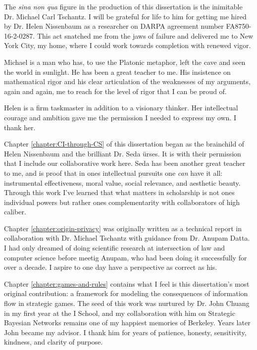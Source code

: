 \documentclass[../thesis.tex]{subfiles}
\begin{document}
 The \textit{sina non qua} figure in the production of this dissertation is the inimitable Dr. Michael Carl Tschantz.
 I will be grateful for life to him for getting me hired by Dr. Helen Nissenbaum as a researcher on DARPA agreement number FA8750-16-2-0287.
 This act snatched me from the jaws of failure and delivered me to New York City, my home, where I could work towards completion with renewed vigor.

 Michael is a man who has, to use the Platonic metaphor,
 left the cave and seen the world in sunlight.
 He has been a great teacher to me.
 His insistence on mathematical rigor and his clear
 articulation of the weaknesses of my arguments, again and again,
 me to reach for the level of rigor
 that I can be proud of.

 Helen is a firm taskmaster in addition to a visionary thinker.
 Her intellectual courage and ambition gave me the permission I needed to express my own.
 I thank her.
 
 Chapter \ref{chapter:CI-through-CS} of this dissertation began as the brainchild of Helen Nissenbaum and the brilliant Dr. Seda {\"u}rses.
 It is with their permission that I include our collaborative work here.
 Seda has been another great teacher to me,
 and is proof that in ones intellectual pursuits
 one \textit{can} have it all:
 instrumental effectiveness, moral value, social relevance,
 and aesthetic beauty.
 Through this work I've learned that what matters in
 scholarship is not ones individual powers but rather
 ones complementarity with collaborators of high caliber.

 Chapter \ref{chapter:origin-privacy} was originally written
 as a technical report in collaboration with Dr. Michael Tschantz
 with guidance from Dr. Anupam Datta.
 I had only dreamed of
 doing scientific research at intersection of law
 and computer science before meetig Anupam,
 who had been doing it successfully for over a decade.
 I aspire to one day have a perspective as correct as his.

 Chapter \ref{chapter:games-and-rules} contains what I feel
 is this dissertation's most original contribution:
 a framework for modeling the consequences of information flow
 in strategic games.
 The seed of this work was nurtured by Dr. John Chuang
 in my first year at the I School, and my collaboration
 with him on Strategic Bayesian Networks remains one of
 my happiest memories of Berkeley.
 Years later John became my advisor.
 I thank him for years of patience, honesty, sensitivity,
 kindness, and clarity  of purpose.
\end{document}
